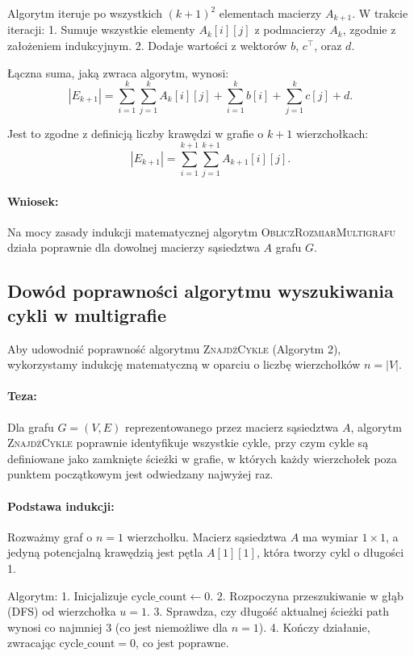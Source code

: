 Algorytm iteruje po wszystkich \( (k+1)^2 \) elementach macierzy \( A_{k+1} \). W trakcie iteracji:
1. Sumuje wszystkie elementy \( A_k[i][j] \) z podmacierzy \( A_k \), zgodnie z założeniem indukcyjnym.
2. Dodaje wartości z wektorów \( b \), \( c^\top \), oraz \( d \).

Łączna suma, jaką zwraca algorytm, wynosi:
\[
|E_{k+1}| = \sum_{i=1}^{k} \sum_{j=1}^{k} A_k[i][j] + \sum_{i=1}^{k} b[i] + \sum_{j=1}^{k} c[j] + d.
\]

Jest to zgodne z definicją liczby krawędzi w grafie o \( k+1 \) wierzchołkach:
\[
|E_{k+1}| = \sum_{i=1}^{k+1} \sum_{j=1}^{k+1} A_{k+1}[i][j].
\]

\paragraph{Wniosek:}
Na mocy zasady indukcji matematycznej algorytm \textsc{ObliczRozmiarMultigrafu} działa poprawnie dla dowolnej macierzy sąsiedztwa \( A \) grafu \( G \).


\subsection{Dowód poprawności algorytmu wyszukiwania cykli w multigrafie}

Aby udowodnić poprawność algorytmu \textsc{ZnajdźCykle} (Algorytm 2), wykorzystamy indukcję matematyczną w oparciu o liczbę wierzchołków \( n = |V| \).

\paragraph{Teza:}
Dla grafu \( G = (V, E) \) reprezentowanego przez macierz sąsiedztwa \( A \), algorytm \textsc{ZnajdźCykle} poprawnie identyfikuje wszystkie cykle, przy czym cykle są definiowane jako zamknięte ścieżki w grafie, w których każdy wierzchołek poza punktem początkowym jest odwiedzany najwyżej raz.

\paragraph{Podstawa indukcji:} 
Rozważmy graf o \( n = 1 \) wierzchołku. Macierz sąsiedztwa \( A \) ma wymiar \( 1 \times 1 \), a jedyną potencjalną krawędzią jest pętla \( A[1][1] \), która tworzy cykl o długości 1.

Algorytm:
1. Inicjalizuje \( \text{cycle\_count} \gets 0 \).
2. Rozpoczyna przeszukiwanie w głąb (DFS) od wierzchołka \( u = 1 \).
3. Sprawdza, czy długość aktualnej ścieżki \( \text{path} \) wynosi co najmniej 3 (co jest niemożliwe dla \( n = 1 \)).
4. Kończy działanie, zwracając \( \text{cycle\_count} = 0 \), co jest poprawne.

